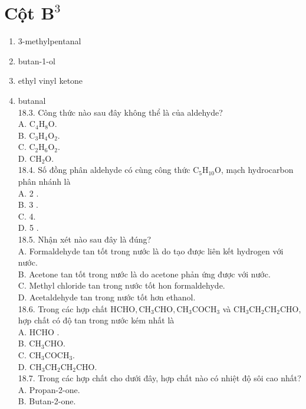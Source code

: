 \documentclass[10pt]{article}
\begin{document}
\section*{Cột $\mathbf{B}^{3}$}
\begin{enumerate}
  \item 3-methylpentanal
  \item butan-1-ol
  \item ethyl vinyl ketone
  \item butanal\\
18.3. Công thức nào sau đây không thể là của aldehyde?\\
A. $\mathrm{C}_{4} \mathrm{H}_{8} \mathrm{O}$.\\
B. $\mathrm{C}_{3} \mathrm{H}_{4} \mathrm{O}_{2}$.\\
C. $\mathrm{C}_{2} \mathrm{H}_{6} \mathrm{O}_{2}$.\\
D. $\mathrm{CH}_{2} \mathrm{O}$.\\
18.4. Số đồng phân aldehyde có cùng công thức $\mathrm{C}_{5} \mathrm{H}_{10} \mathrm{O}$, mạch hydrocarbon phân nhánh là\\
A. 2 .\\
B. 3 .\\
C. 4.\\
D. 5 .\\
18.5. Nhận xét nào sau đây là đúng?\\
A. Formaldehyde tan tốt trong nước là do tạo được liên kết hydrogen với nước.\\
B. Acetone tan tốt trong nước là do acetone phản ứng được với nước.\\
C. Methyl chloride tan trong nước tốt hon formaldehyde.\\
D. Acetaldehyde tan trong nước tốt hơn ethanol.\\
18.6. Trong các hợp chất $\mathrm{HCHO}, \mathrm{CH}_{3} \mathrm{CHO}, \mathrm{CH}_{3} \mathrm{COCH}_{3}$ và $\mathrm{CH}_{3} \mathrm{CH}_{2} \mathrm{CH}_{2} \mathrm{CHO}$, hợp chất có độ tan trong nước kém nhất là\\
A. HCHO .\\
B. $\mathrm{CH}_{3} \mathrm{CHO}$.\\
C. $\mathrm{CH}_{3} \mathrm{COCH}_{3}$.\\
D. $\mathrm{CH}_{3} \mathrm{CH}_{2} \mathrm{CH}_{2} \mathrm{CHO}$.\\
18.7. Trong các hợp chất cho dưới đây, hợp chất nào có nhiệt độ sôi cao nhất?\\
A. Propan-2-one.\\
B. Butan-2-one.\\

\end{enumerate}
\end{document}
